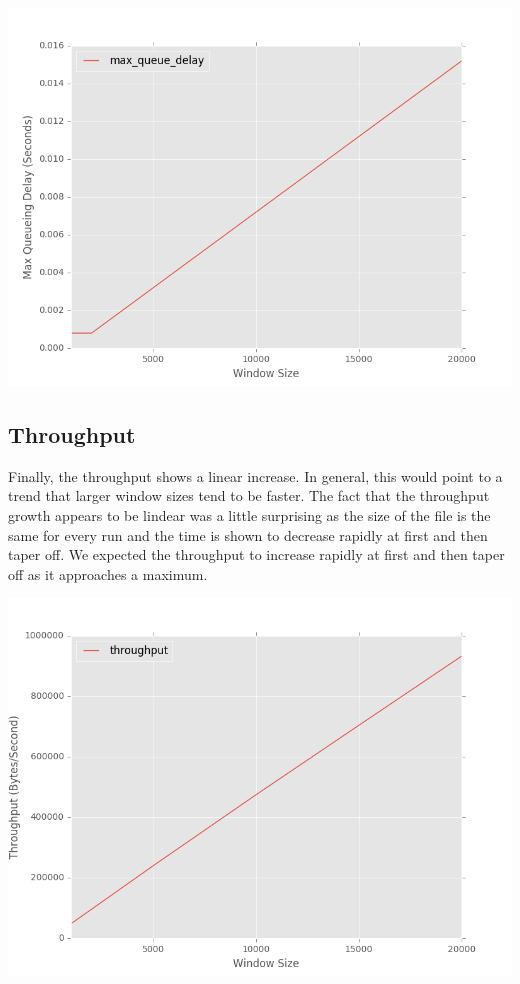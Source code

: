 \documentclass[11pt]{article}
\begin{document}
\vspace{5mm}

\includegraphics[width=17cm]{graphs/max-queue-graph.png}

\clearpage
\subsection{Throughput}

Finally, the throughput shows a linear increase. In general, this would point to a trend that larger window sizes tend to be faster. The fact that the throughput growth appears to be lindear was a little surprising as the size of the file is the same for every run and the time is shown to decrease rapidly at first and then taper off. We expected the throughput to increase rapidly at first and then taper off as it approaches a maximum.

\vspace{5mm}

\includegraphics[width=17cm]{graphs/throughput.png}

\vspace{5mm}
\end{document}
